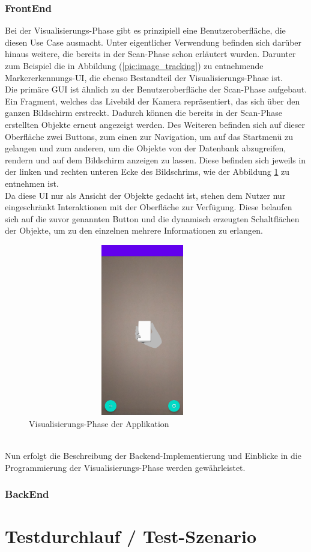 \subsubsection{FrontEnd}
Bei der Visualisierungs-Phase gibt es prinzipiell eine Benutzeroberfläche, die diesen Use Case ausmacht. Unter eigentlicher Verwendung befinden sich darüber 
hinaus weitere, die bereits in der Scan-Phase schon erläutert wurden. Darunter zum Beispiel die in Abbildung (\ref{pic:image_tracking}) zu entnehmende 
Markererkennungs-\acs{UI}, die ebenso Bestandteil der Visualisierungs-Phase ist. 
\\ 
Die primäre \acs{GUI} ist ähnlich zu der Benutzeroberfläche der Scan-Phase aufgebaut. Ein Fragment, welches das Livebild der Kamera repräsentiert, das 
sich über den ganzen Bildschirm erstreckt. Dadurch können die bereits in der Scan-Phase erstellten Objekte erneut angezeigt werden. Des Weiteren befinden 
sich auf dieser Oberfläche zwei Buttons, zum einen zur Navigation, um auf das Startmenü zu gelangen und zum anderen, um die Objekte von der Datenbank 
abzugreifen, rendern und auf dem Bildschirm anzeigen zu lassen. Diese befinden sich jeweils in der linken und rechten unteren Ecke des Bildschrims, wie 
der Abbildung \ref{pic:visual} zu entnehmen ist. 
\\ 
Da diese \acs{UI} nur als Ansicht der Objekte gedacht ist, stehen dem Nutzer nur eingeschränkt Interaktionen mit der Oberfläche zur Verfügung. Diese 
belaufen sich auf die zuvor genannten Button und die dynamisch erzeugten Schaltflächen der Objekte, um zu den einzelnen mehrere Informationen zu erlangen. 
\begin{figure}[hbt!]
    \centering
    \includegraphics[width=10cm,height=7.5cm,keepaspectratio]{4Umsetzung/Bilder/visual-phase.jpg}
    \caption{Visualisierungs-Phase der Applikation}
    \label{pic:visual}
\end{figure}
\\ 
Nun erfolgt die Beschreibung der Backend-Implementierung und Einblicke in die Programmierung der Visualisierungs-Phase werden gewährleistet. 
\subsubsection{BackEnd}

\section{Testdurchlauf / Test-Szenario}
\label{chap:testdurchlauf}